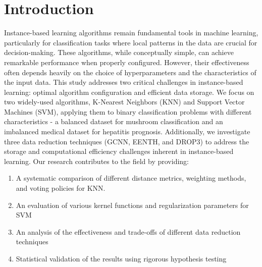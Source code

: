 \section{Introduction}
Instance-based learning algorithms remain fundamental tools in machine learning, particularly for classification tasks where local patterns in the data are crucial for decision-making. These algorithms, while conceptually simple, can achieve remarkable performance when properly configured. However, their effectiveness often depends heavily on the choice of hyperparameters and the characteristics of the input data.
This study addresses two critical challenges in instance-based learning: optimal algorithm configuration and efficient data storage. We focus on two widely-used algorithms, K-Nearest Neighbors (KNN) and Support Vector Machines (SVM), applying them to binary classification problems with different characteristics - a balanced dataset for mushroom classification and an imbalanced medical dataset for hepatitis prognosis. Additionally, we investigate three data reduction techniques (GCNN, EENTH, and DROP3) to address the storage and computational efficiency challenges inherent in instance-based learning.
Our research contributes to the field by providing:

\begin{enumerate}
	\item A systematic comparison of different distance metrics, weighting methods, and voting policies for KNN.
	\item An evaluation of various kernel functions and regularization parameters for SVM
	\item An analysis of the effectiveness and trade-offs of different data reduction techniques
	\item Statistical validation of the results using rigorous hypothesis testing
\end{enumerate}